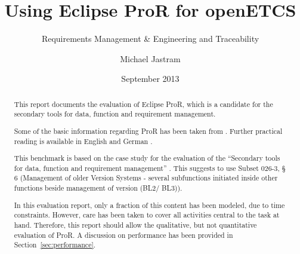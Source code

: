 \documentclass{template/openetcs_report}
\begin{document}
\frontmatter
{}




\title{Using Eclipse ProR for openETCS}

\subtitle{Requirements Management \& Engineering and Traceability}

\date{September 2013}

\author{Michael Jastram}





\begin{abstract}
This report documents the evaluation of Eclipse ProR, which is a candidate for the secondary tools for data, function and requirement management.

Some of the basic information regarding ProR has been taken from \cite{RMF_Mark_Book_Jastram_2013}.  Further practical reading is available in English \cite{jastram_forms_2012} and German \cite{reqif_ObjektSpektrum_2013}.

This benchmark is based on the case study for the evaluation of the ``Secondary tools for data, function and requirement management'' \cite{subset026-6}.  This suggests to use Subset 026-3, § 6 (Management of older Version Systems - several subfunctions initiated inside other functions beside management of version (BL2/ BL3)).

In this evaluation report, only a fraction of this content has been modeled, due to time constraints.  However, care has been taken to cover all activities central to the task at hand.  Therefore, this report should allow the qualitative, but not quantitative evaluation of ProR.  A discussion on performance has been provided in Section~\ref{sec:performance}.

\end{abstract}
\end{document}
